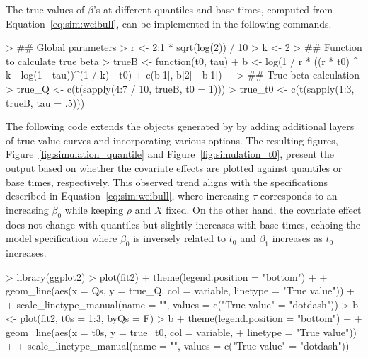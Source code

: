 The true values of $\beta$'s at different quantiles and base times, 
computed from Equation~\eqref{eq:sim:weibull}, can be implemented in the following commands.
\begin{example}
  > ## Global parameters
  > r <- 2:1 * sqrt(log(2)) / 10
  > k <- 2
  > ## Function to calculate true beta
  > trueB <- function(t0, tau) {
  +     b <- log(1 / r * ((r * t0) ^ k - log(1 - tau))^(1 / k) - t0)
  +     c(b[1], b[2] - b[1])
  + }
  > ## True beta calculation
  > true_Q <- c(t(sapply(4:7 / 10, trueB, t0 = 1)))
  > true_t0 <- c(t(sapply(1:3, trueB, tau = .5)))
\end{example}
% 

The following code extends the  objects generated by  
by adding additional layers of true value curves and incorporating various  options. 
The resulting figures, Figure~\ref{fig:simulation_quantile} and Figure~\ref{fig:simulation_t0}, 
present the output based on whether the covariate effects are plotted against quantiles or base times, respectively. 
This observed trend aligns with the specifications described in Equation~\eqref{eq:sim:weibull}, 
where increasing $\tau$ corresponds to an increasing $\beta_0$ while keeping $\rho$ and $X$ fixed. 
On the other hand, the covariate effect does not change with quantiles but slightly increases with base times, 
echoing the model specification where $\beta_0$ is inversely related to $t_0$ and $\beta_1$ 
increases as $t_0$ increases.

\begin{example}
  > library(ggplot2)	
  > plot(fit2) + theme(legend.position = "bottom") + 
  +    geom_line(aes(x = Qs, y = true_Q, col = variable, linetype = "True value")) +
  +    scale_linetype_manual(name = "", values = c("True value" = "dotdash"))
  > b <- plot(fit2, t0s = 1:3, byQs = F)
  > b + theme(legend.position = "bottom") +
  +    geom_line(aes(x = t0s, y = true_t0, col = variable,
  +                 linetype = "True value")) +
  +    scale_linetype_manual(name = "", values = c("True value" = "dotdash"))
\end{example}
% 

